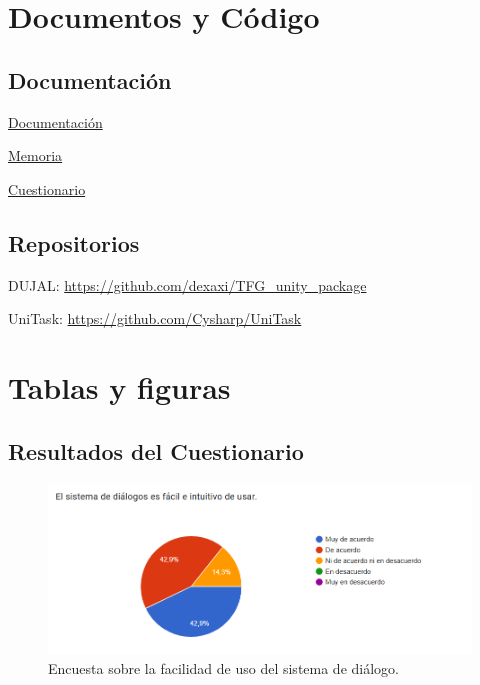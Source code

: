 \section{Documentos y Código}
\subsection{Documentación}
\begin{compactitem}
  \item \href{https://github.com/dexaxi/TFG_Unity_Package/blob/main/Assets/DUJAL/Documentation/DUJAL%20Documentation.pdf}{Documentación}
  \item \href{https://github.com/dexaxi/TFG_Unity_Package/blob/main/Assets/DUJAL/Documentation/Memoria%20TFG%20%C3%81ngel%20Baeza%20S%C3%A1nchez.pdf}{Memoria}
  \item \href{https://docs.google.com/forms/d/e/1FAIpQLSd1cEq_ghDKNGu-EFjOm2AS5huoM882GzUzjwZkY_DLQak9Fw/viewform?usp=sharing&ouid=100594158238727737282}{Cuestionario}
\end{compactitem}

\subsection{Repositorios}
\begin{compactitem}
  \item DUJAL: \url{https://github.com/dexaxi/TFG_unity_package}
  \item UniTask: \url{https://github.com/Cysharp/UniTask}
\end{compactitem}


\section{Tablas y figuras}
\subsection{Resultados del Cuestionario}
\begin{figure}[H]
  \centering
  \includegraphics[width=450px,clip=true]{CUESTIONARIO_1.png}
  \caption{Encuesta sobre la facilidad de uso del sistema de diálogo.}
  \label{fig:CUESTIONARIO_1}
\end{figure}
\raggedbottom

